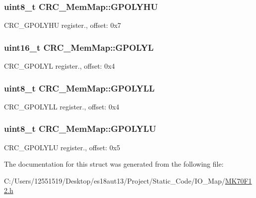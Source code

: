\subsubsection[{G\+P\+O\+L\+Y\+H\+U}]{\setlength{\rightskip}{0pt plus 5cm}uint8\+\_\+t C\+R\+C\+\_\+\+Mem\+Map\+::\+G\+P\+O\+L\+Y\+H\+U}\label{struct_c_r_c___mem_map_ae7c166006427c82d21b88417313cf511}
C\+R\+C\+\_\+\+G\+P\+O\+L\+Y\+H\+U register., offset\+: 0x7 \hypertarget{struct_c_r_c___mem_map_a4cd3b43b213defbaa07381a32b24af67}{}
\subsubsection[{G\+P\+O\+L\+Y\+L}]{\setlength{\rightskip}{0pt plus 5cm}uint16\+\_\+t C\+R\+C\+\_\+\+Mem\+Map\+::\+G\+P\+O\+L\+Y\+L}\label{struct_c_r_c___mem_map_a4cd3b43b213defbaa07381a32b24af67}
C\+R\+C\+\_\+\+G\+P\+O\+L\+Y\+L register., offset\+: 0x4 \hypertarget{struct_c_r_c___mem_map_afefe4288aecf5a31ca6f6d64317eeb4b}{}
\subsubsection[{G\+P\+O\+L\+Y\+L\+L}]{\setlength{\rightskip}{0pt plus 5cm}uint8\+\_\+t C\+R\+C\+\_\+\+Mem\+Map\+::\+G\+P\+O\+L\+Y\+L\+L}\label{struct_c_r_c___mem_map_afefe4288aecf5a31ca6f6d64317eeb4b}
C\+R\+C\+\_\+\+G\+P\+O\+L\+Y\+L\+L register., offset\+: 0x4 \hypertarget{struct_c_r_c___mem_map_a0ba8bc9ddb8de4ca001f205f32cdd626}{}
\subsubsection[{G\+P\+O\+L\+Y\+L\+U}]{\setlength{\rightskip}{0pt plus 5cm}uint8\+\_\+t C\+R\+C\+\_\+\+Mem\+Map\+::\+G\+P\+O\+L\+Y\+L\+U}\label{struct_c_r_c___mem_map_a0ba8bc9ddb8de4ca001f205f32cdd626}
C\+R\+C\+\_\+\+G\+P\+O\+L\+Y\+L\+U register., offset\+: 0x5 

The documentation for this struct was generated from the following file\+:\begin{DoxyCompactItemize}
\item 
C\+:/\+Users/12551519/\+Desktop/es18aut13/\+Project/\+Static\+\_\+\+Code/\+I\+O\+\_\+\+Map/\hyperlink{_m_k70_f12_8h}{M\+K70\+F12.\+h}\end{DoxyCompactItemize}
